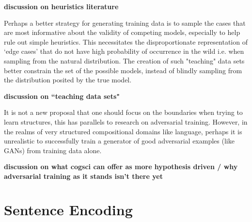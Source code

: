 \documentclass[10pt,letterpaper]{article}
\begin{document}
\textbf{discussion on heuristics literature}

Perhaps a better strategy for generating training data is to sample the cases that are most informative about the validity of competing models, especially to help rule out simple heuristics. This necessitates the disproportionate representation of `edge cases' that do not have high probability of occurrence in the wild i.e. when sampling from the natural distribution. The creation of such "teaching" data sets better constrain the set of the possible models, instead of blindly sampling from the distribution posited by the true model.

\textbf{discussion on ``teaching data sets"}

It is not a new proposal that one should focus on the boundaries when trying to learn structures, this has parallels to research on adversarial training. However, in the realms of very structured compositional domains like language, perhaps it is unrealistic to successfully train a generator of good adversarial examples (like GANs) from training data alone. 

\textbf{discussion on what cogsci can offer as more hypothesis driven / why adversarial training as it stands isn't there yet}



\section{Sentence Encoding}
\end{document}
